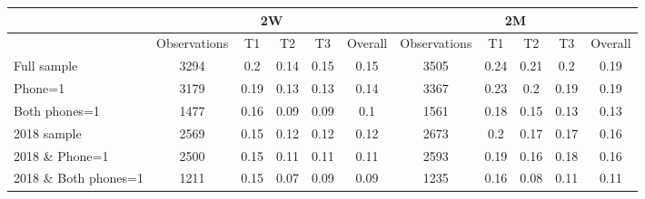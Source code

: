 \begin{tabular}{lcccccccccc}
\toprule
      & \multicolumn{5}{c}{2W}                & \multicolumn{5}{c}{2M} \\
\midrule
      & Observations & T1    & T2    & T3    & Overall & Observations & T1    & T2    & T3    & Overall \\
\midrule
\midrule
Full sample & 3294  & 0.2   & 0.14  & 0.15  & 0.15  & 3505  & 0.24  & 0.21  & 0.2   & 0.19 \\
Phone=1 & 3179  & 0.19  & 0.13  & 0.13  & 0.14  & 3367  & 0.23  & 0.2   & 0.19  & 0.19 \\
Both phones=1 & 1477  & 0.16  & 0.09  & 0.09  & 0.1   & 1561  & 0.18  & 0.15  & 0.13  & 0.13 \\
2018 sample & 2569  & 0.15  & 0.12  & 0.12  & 0.12  & 2673  & 0.2   & 0.17  & 0.17  & 0.16 \\
2018 \& Phone=1 & 2500  & 0.15  & 0.11  & 0.11  & 0.11  & 2593  & 0.19  & 0.16  & 0.18  & 0.16 \\
2018 \& Both phones=1 & 1211  & 0.15  & 0.07  & 0.09  & 0.09  & 1235  & 0.16  & 0.08  & 0.11  & 0.11 \\
\bottomrule
\bottomrule
\end{tabular}%
